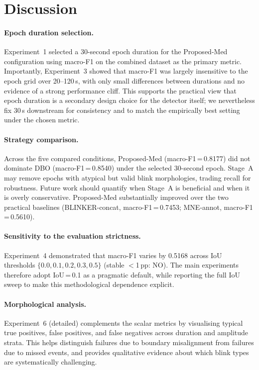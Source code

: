 \section{Discussion}

\paragraph{Epoch duration selection.}
Experiment~1 selected a 30-second epoch duration for the Proposed-Med configuration using
macro-F1 on the combined dataset as the primary metric. Importantly, Experiment~3 showed
that macro-F1 was largely insensitive to the epoch grid over 20--120\,s, with only small differences between durations and no evidence of a strong performance cliff. This supports
the practical view that epoch duration is a secondary design choice for the detector
itself; we nevertheless fix 30\,s downstream for consistency and to match the empirically
best setting under the chosen metric.

\paragraph{Strategy comparison.}
Across the five compared conditions, Proposed-Med (macro-F1\,=\,0.8177) did not dominate DBO (macro-F1\,=\,0.8540) under the selected 30-second epoch. Stage~A may remove epochs with atypical but valid blink morphologies, trading recall for robustness. Future work should quantify when Stage~A is beneficial and when it is overly conservative.
Proposed-Med substantially improved over the two practical baselines
(BLINKER-concat, macro-F1\,=\,0.7453; MNE-annot, macro-F1\,=\,0.5610).

\paragraph{Sensitivity to the evaluation strictness.}
Experiment~4 demonstrated that macro-F1 varies by 0.5168 across IoU thresholds $\{0.0,0.1,0.2,0.3,0.5\}$ (stable $<$1\,pp: NO). The main experiments therefore adopt IoU\,=\,0.1 as a pragmatic default,
while reporting the full IoU sweep to make this methodological dependence explicit.

\paragraph{Morphological analysis.}
Experiment~6 (detailed) complements the scalar metrics by visualising typical true
positives, false positives, and false negatives across duration and amplitude strata. This
helps distinguish failures due to boundary misalignment from failures due to missed events,
and provides qualitative evidence about which blink types are systematically challenging.
